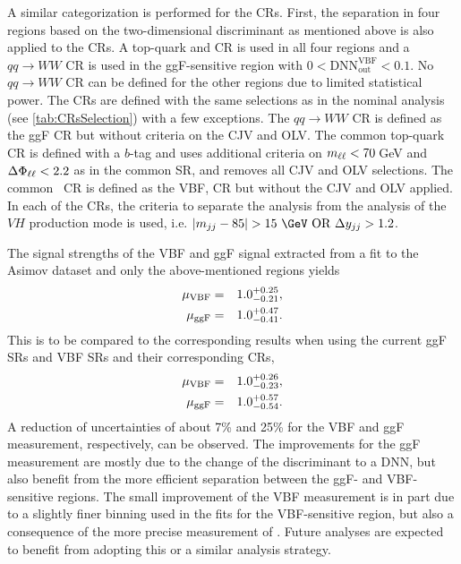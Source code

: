 A similar categorization is performed for the CRs. 
First, the separation in four regions based on the two-dimensional discriminant as mentioned above is also applied to the CRs. A top-quark and \Ztautau CR is used in all four regions and a $qq \to WW$ CR is used in the ggF-sensitive region with $0 < \text{DNN}_\mathrm{out}^\mathrm{VBF} < 0.1$. No $qq \to WW$ CR can be defined for the other regions due to limited statistical power. 
The CRs are defined with the same selections as in the nominal analysis (see \cref{tab:CRsSelection}) with a few exceptions. 
The $qq \to WW$ CR is defined as the ggF \TwoJet CR but without criteria on the CJV and OLV.
The common top-quark CR is defined with a $b$-tag and uses additional criteria on $m_{\ell\ell} < 70\,$GeV and $\Delta\Phi_{\ell\ell} < 2.2$ as in the common \TwoJet SR, and removes all CJV and OLV selections. The common \Ztautau\ CR is defined as the VBF, \Ztautau CR but without the CJV and OLV applied. 
In each of the CRs, the criteria to separate the analysis from the analysis of the $VH$ production mode is used, i.e. $|\mjj-85| > 15~\GeV \text{ OR } \dyjj > 1.2$.

The signal strengths of the VBF and ggF signal extracted from a fit to the Asimov dataset and only the above-mentioned \TwoJet regions yields 
\begin{eqnarray*}
    \mu_{\mathrm{VBF}} &=& 1.0^{+0.25}_{-0.21}, \\
    \mu_{\mathrm{ggF}} &=& 1.0^{+0.47}_{-0.41}.
\end{eqnarray*}
This is to be compared to the corresponding results when using the current ggF \TwoJet SRs and VBF \TwoJet SRs and their corresponding CRs,
\begin{eqnarray*}
    \mu_{\mathrm{VBF}} &=& 1.0^{+0.26}_{-0.23}, \\
    \mu_{\mathrm{ggF}} &=& 1.0^{+0.57}_{-0.54}.
\end{eqnarray*}
A reduction of uncertainties of about 7\% and 25\% for the VBF and ggF measurement, respectively, can be observed. 
The improvements for the ggF measurement are mostly due to the change of the discriminant to a DNN, but also benefit from the more efficient separation between the ggF- and VBF-sensitive regions. 
The small improvement of the VBF measurement is in part due to a slightly finer binning used in the fits for the VBF-sensitive region, but also a consequence of the more precise measurement of \muGGF. 
Future analyses are expected to benefit from adopting this or a similar analysis strategy. 

